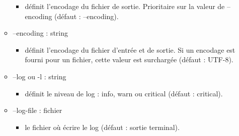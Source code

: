 \documentclass[manual-fr.tex]{subfiles}
\begin{document}
\begin{itemize}
\begin{itemize}
                \begin{itemize}
                    \item[] définit l'encodage du fichier de sortie. Prioritaire sur la valeur de --encoding (défaut : --encoding).
                \end{itemize}
            \item[] --encoding : string
                \begin{itemize}
                    \item[] définit l'encodage du fichier d'entrée et de sortie. Si un encodage est fourni pour un fichier,
                        cette valeur est surchargée (défaut : UTF-8).
                \end{itemize}
            \item[] --log ou -l : string
                \begin{itemize}
                    \item[] définit le niveau de log : info, warn ou critical (défaut : critical).
                \end{itemize}
            \item[] --log-file : fichier
                \begin{itemize}
                    \item[] le fichier où écrire le log (défaut : sortie terminal).
                \end{itemize}
        \end{itemize}
\end{itemize}
\end{document}
